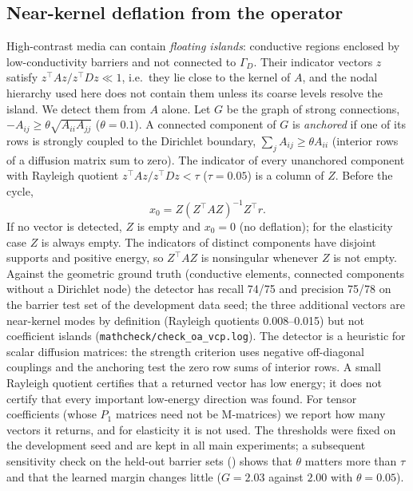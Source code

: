 \subsection{Near-kernel deflation from the operator}\label{sec:deflation}
High-contrast media can contain \emph{floating islands}: conductive regions enclosed by low-conductivity barriers and
not connected to $\Gamma_D$. Their indicator vectors $z$ satisfy $z^\top A z/z^\top D z \ll 1$, i.e.\ they lie close to the
kernel of $A$, and the nodal hierarchy used here does not contain them unless its coarse levels resolve the island. We detect
them from $A$ alone. Let $G$ be the graph of strong connections, $-A_{ij}\ge\theta\sqrt{A_{ii}A_{jj}}$ ($\theta = 0.1$). A
connected component of $G$ is \emph{anchored} if one of its rows is strongly coupled to the Dirichlet boundary,
$\sum_j A_{ij}\ge\theta A_{ii}$ (interior rows of a diffusion matrix sum to zero). The indicator of every unanchored
component with Rayleigh quotient $z^\top Az/z^\top Dz<\tau$ ($\tau = 0.05$) is a column of $Z$. Before the cycle,
\begin{equation}\label{eq:deflation}
  x_0 = Z(Z^\top A Z)^{-1}Z^\top r .
\end{equation}
If no vector is detected, $Z$ is empty and $x_0 = 0$ (no deflation); for the elasticity case $Z$ is always empty. The
indicators of distinct components have disjoint supports and positive energy, so $Z^\top AZ$ is nonsingular whenever $Z$ is
not empty.
Against the geometric ground truth (conductive elements, connected components without a Dirichlet node) the detector
has recall 74/75 and precision 75/78 on the barrier test set of the development data seed; the three additional vectors are near-kernel modes by
definition (Rayleigh quotients 0.008--0.015) but not coefficient islands (\texttt{mathcheck/check\_oa\_vcp.log}).
The detector is a heuristic for scalar diffusion matrices: the strength criterion uses negative off-diagonal couplings
and the anchoring test the zero row sums of interior rows. A small Rayleigh quotient certifies that a returned vector has
low energy; it does not certify that every important low-energy direction was found. For tensor coefficients (whose
$P_1$ matrices need not be M-matrices) we report how many vectors it returns, and for elasticity it is not used. The
thresholds were fixed on the development seed and are kept in all main experiments; a subsequent sensitivity check on the
held-out barrier sets () shows that $\theta$ matters more than $\tau$ and that the learned margin
changes little ($G = 2.03$ against $2.00$ with $\theta = 0.05$).

